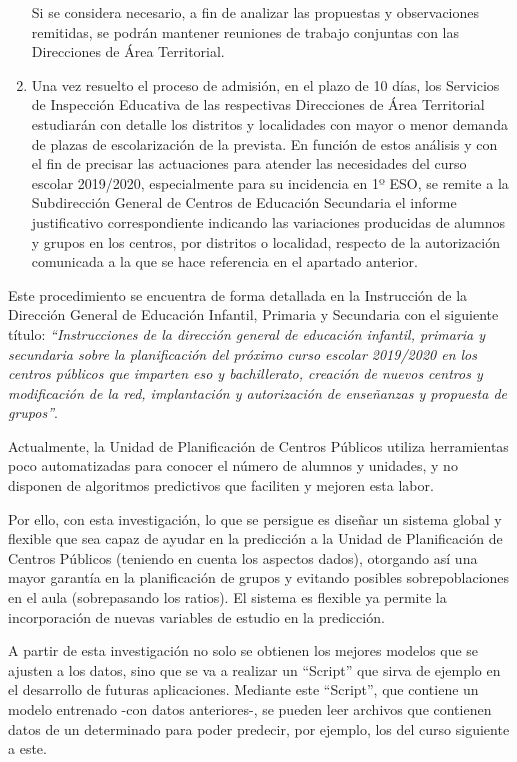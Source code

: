 \begin{enumerate}
	Si se considera necesario, a fin de analizar las propuestas y observaciones remitidas, se podrán mantener reuniones de trabajo conjuntas con las Direcciones de Área Territorial.
	
	\item Una vez resuelto el proceso de admisión, en el plazo de 10 días, los Servicios de Inspección Educativa de las respectivas Direcciones de Área Territorial estudiarán con detalle los distritos y localidades con mayor o menor demanda de plazas de escolarización de la prevista. En función de estos análisis y con el fin de precisar las actuaciones para atender las necesidades del curso escolar 2019/2020, especialmente para su incidencia en 1º ESO, se remite a la Subdirección General de Centros de Educación Secundaria el informe justificativo correspondiente indicando las variaciones producidas de alumnos y grupos en los centros, por distritos o localidad, respecto de la autorización comunicada a la que se hace referencia en el apartado anterior. 
\end{enumerate}

Este procedimiento se encuentra de forma detallada en la Instrucción de la Dirección General de Educación Infantil, Primaria y Secundaria con el siguiente título: \textit{``Instrucciones de la dirección general de educación infantil, primaria y secundaria sobre la planificación del próximo curso escolar 2019/2020 en los centros públicos que imparten eso y bachillerato, creación de nuevos centros y modificación de la red, implantación y autorización de enseñanzas y propuesta de grupos''}. \cite{INSTRCONSE}

Actualmente, la Unidad de Planificación de Centros Públicos utiliza herramientas poco automatizadas para conocer el número de alumnos y unidades, y no disponen de algoritmos predictivos que faciliten y mejoren esta labor.

Por ello, con esta investigación, lo que se persigue es diseñar un sistema global y flexible que sea capaz de ayudar en la predicción a la Unidad de Planificación de Centros Públicos (teniendo  en cuenta los aspectos dados), otorgando así una mayor garantía en la planificación de grupos y evitando posibles sobrepoblaciones en el aula (sobrepasando los ratios). El sistema es flexible ya permite la incorporación de nuevas variables de estudio en la predicción.

A partir de esta investigación no solo se obtienen los mejores modelos que se ajusten a los datos, sino que se va a realizar un ``Script'' que sirva de ejemplo en el desarrollo de futuras aplicaciones. Mediante este ``Script'', que contiene un modelo entrenado -con datos anteriores-, se pueden leer archivos que contienen datos de un determinado para poder predecir, por ejemplo, los del curso siguiente a este.

